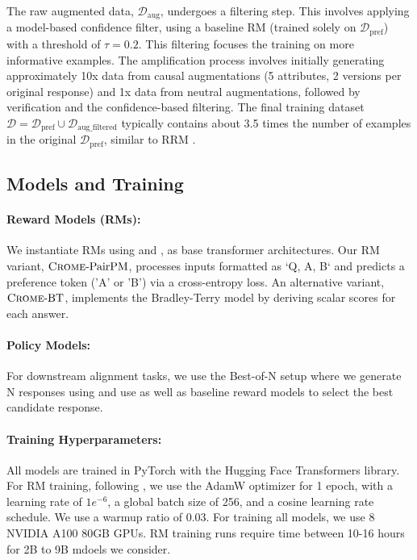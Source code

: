The raw augmented data, $\mathcal{D}_{\text{aug}}$, undergoes a filtering step. This involves applying a model-based confidence filter, using a baseline RM (trained solely on $\mathcal{D}_{\text{pref}}$) with a threshold of $\tau=0.2$. This filtering focuses the training on more informative examples. The amplification process involves initially generating approximately 10x data from causal augmentations (5 attributes, 2 versions per original response) and 1x data from neutral augmentations, followed by verification and the confidence-based filtering. The final training dataset $\mathcal{D} = \mathcal{D}_{\text{pref}} \cup \mathcal{D}_{\text{aug\_filtered}}$ typically contains about 3.5 times the number of examples in the original $\mathcal{D}_{\text{pref}}$, similar to RRM \citep{liu2024rrm}.

\subsection{Models and Training}
\label{app:models_training_details}

\paragraph{Reward Models (RMs):} We instantiate RMs using {\qwen{}} \citep{yang2024qwen2} and {}, {} \citep{team2024gemma} as base transformer architectures. Our RM variant, $\carma\text{-PairPM}$, processes inputs formatted as `Q, A, B` and predicts a preference token ('A' or 'B') via a cross-entropy loss. An alternative variant, $\carma\text{-BT}$, implements the Bradley-Terry model by deriving scalar scores for each answer.

\paragraph{Policy Models:} For downstream alignment tasks, we use the Best-of-N setup
where we generate N responses using  and use \carma{} as well as baseline reward models to select the best candidate response.

\paragraph{Training Hyperparameters:} All models are trained in PyTorch with the Hugging Face Transformers library. For RM training, following \citet{liu2024rrm}, we use the AdamW optimizer \citep{loshchilov2017decoupled} for 1 epoch, with a learning rate of $1 e^{-6}$, a global batch size of 256, and a cosine learning rate schedule. We use a warmup ratio of 0.03. For training all models, we use 8 NVIDIA A100 80GB GPUs. RM training runs require time between 10-16 hours for 2B to 9B mdoels we consider.


